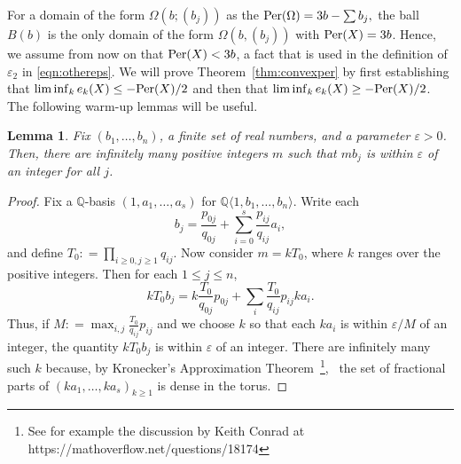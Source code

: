 \documentclass[11pt, reqno]{amsart}
\newtheorem{lemma}[thm]{Lemma}
\theoremstyle{remark}
\numberwithin{equation}{subsection}
\numberwithin{figure}{section}
\theoremstyle{customremark}
\newcommand{\Per}{{\rm Per}}
\newcommand{\Om}{{\Omega}}
\newcommand{\Q}{\mathbb{Q}}
\newcommand{\eps}{\varepsilon}
\begin{document}
For a domain of the form $\Om(b;(b_j))$ as the $\Per(\Om)=3b-\sum b_j,$
 the ball $B(b)$ is the only domain of the form $\Om(b, (b_j))$ with $\Per(X) = 3b$. Hence, we  assume from now on that $\Per(X)< 3b$, a fact that is used in the definition of $\eps_2$ in \eqref{eqn:othereps}.  
We will prove Theorem~\ref{thm:convexper}
by first establishing that $\liminf_{k} e_k(X) \le - \Per(X)/2$ and then that 
$\liminf_{k} e_k(X) \ge - \Per(X)/2$.
The following warm-up lemmas will be useful. 

\begin{lemma}\label{lem:warmup}
Fix $(b_1,\ldots,b_n)$, a finite set of real numbers, and a parameter $\eps> 0$.   Then, there are infinitely many positive integers $m$ such that $mb_j$ is within $\eps$ of an integer for all $j$.
\end{lemma}


\begin{proof}
Fix a $\mathbb{Q}$-basis $(1,a_1,\ldots,a_s)$ for $\Q\langle 1,b_1,\ldots,b_n\rangle.$  
Write each 
\[ b_j =\frac{ p_{0j}}{q_{0j}} + \sum_{i=0}^s \frac{ p_{ij}}{q_{ij}} a_i,\]
and define $T_{0}: = \prod_{i\ge 0,j\ge 1} q_{ij}$. 
Now consider $m = k T_{0}$, where $k$ ranges over the positive integers.  Then for each $1\le j\le n$, 
\[ k T_{0} b_j = k \frac{T_{0}}{q_{0j}} p_{0j} + \sum_i \frac{T_{0}}{q_{ij}} p_{ij} k a_i.\]
Thus, if $M: = \max_{i,j} \frac{T_{0}}{q_{ij}} p_{ij}$ and we choose $k$ so that 
 each $k a_i$ is within $\eps/M$ of an integer, the quantity 
 $k T_{0} b_j$ is within $\eps$ of an integer. There are infinitely many such $k$  because, by 
 Kronecker's Approximation Theorem~\footnote
{
See for example the discussion by Keith Conrad at https://mathoverflow.net/questions/18174}, \
 the set of fractional parts of $(k a_1, \ldots, k a_s)_{k\ge 1}$ is dense in the torus.  
\end{proof}
\end{document}
